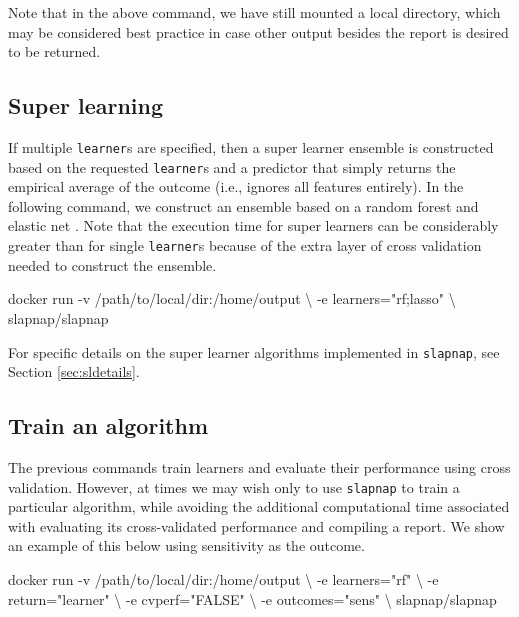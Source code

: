 \documentclass[]{article}
\newenvironment{Shaded}{\begin{snugshade}}{\end{snugshade}}
\newcommand{\StringTok}[1]{\textcolor[rgb]{0.31,0.60,0.02}{#1}}
\newcommand{\ExtensionTok}[1]{#1}
\newcommand{\NormalTok}[1]{#1}
\begin{document}
Note that in the above command, we have still mounted a local directory,
which may be considered best practice in case other output besides the
report is desired to be returned.

\subsection{Super learning}\label{super-learning}

If multiple \texttt{learner}s are specified, then a super learner
ensemble \citep{vanderlaan2007} is constructed based on the requested
\texttt{learner}s and a predictor that simply returns the empirical
average of the outcome (i.e., ignores all features entirely). In the
following command, we construct an ensemble based on a random forest
\citep{breiman2001} and elastic net \citep{zou2005}. Note that the
execution time for super learners can be considerably greater than for
single \texttt{learner}s because of the extra layer of cross validation
needed to construct the ensemble.

\begin{Shaded}
\begin{Highlighting}[]
\ExtensionTok{docker}\NormalTok{ run -v /path/to/local/dir:/home/output \textbackslash{}}
\NormalTok{           -e learners=}\StringTok{"rf;lasso"}\NormalTok{ \textbackslash{}}
\NormalTok{           slapnap/slapnap}
\end{Highlighting}
\end{Shaded}

For specific details on the super learner algorithms implemented in
\texttt{slapnap}, see Section \ref{sec:sldetails}.

\subsection{Train an algorithm}\label{train-an-algorithm}

The previous commands train learners and evaluate their performance
using cross validation. However, at times we may wish only to use
\texttt{slapnap} to train a particular algorithm, while avoiding the
additional computational time associated with evaluating its
cross-validated performance and compiling a report. We show an example
of this below using sensitivity as the outcome.

\begin{Shaded}
\begin{Highlighting}[]
\ExtensionTok{docker}\NormalTok{ run -v /path/to/local/dir:/home/output \textbackslash{}}
\NormalTok{           -e learners=}\StringTok{"rf"}\NormalTok{ \textbackslash{}}
\NormalTok{           -e return=}\StringTok{"learner"}\NormalTok{ \textbackslash{}}
\NormalTok{           -e cvperf=}\StringTok{"FALSE"}\NormalTok{ \textbackslash{}}
\NormalTok{           -e outcomes=}\StringTok{"sens"}\NormalTok{ \textbackslash{}}
\NormalTok{           slapnap/slapnap}
\end{Highlighting}
\end{Shaded}
\end{document}
